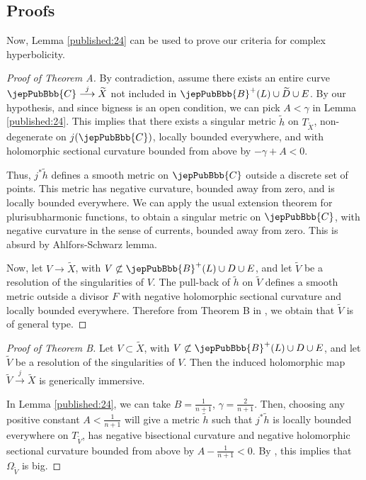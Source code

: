 \subsection{Proofs}

Now, Lemma \ref{published:24} can be used to prove our criteria for complex hyperbolicity.

\begin{proof}[Proof of Theorem A]

By contradiction, assume there exists an entire curve  $\jepPubBbb{C} \overset{j}{\longrightarrow} \widetilde{X}$ not included in $\jepPubBbb{B}^+(L) \cup \widetilde{D} \cup E$. By our hypothesis, and since bigness is an open condition, we can pick $A <  \gamma$ in Lemma \ref{published:24}. This implies that there exists a singular metric $\widetilde{h}$ on $T_{\widetilde{X}}$, non-degenerate on $j(\jepPubBbb{C})$, locally bounded everywhere, and with holomorphic sectional curvature bounded from above by $- \gamma + A < 0$. 

Thus, $j^\ast \widetilde{h}$ defines a smooth metric on $\jepPubBbb{C}$ outside a discrete set of points. This metric has negative curvature, bounded away from zero, and is locally bounded everywhere. We can apply the usual extension theorem for plurisubharmonic functions, to obtain 
a singular metric on $\jepPubBbb{C}$, with negative curvature in the sense of currents, bounded away from zero. This is absurd by Ahlfors-Schwarz lemma. 

Now, let $V \longrightarrow \widetilde{X}$, with $V \not\subset \jepPubBbb{B}^+(L) \cup D \cup E$, and let $\widetilde{V}$ be a resolution of the singularities of $V$. The pull-back of $\widetilde{h}$ on $\widetilde{V}$ defines a smooth metric outside a divisor $F$ with negative holomorphic sectional curvature and locally bounded everywhere. Therefore from Theorem B in \cite{pubref16}, we obtain that $\widetilde{V}$ is of general type.
\end{proof}

\begin{proof}[Proof of Theorem B] Let $V \subset \widetilde{X}$, with $V \not\subset \jepPubBbb{B}^+(L) \cup D \cup E$, and let $\widetilde{V}$ be a resolution of the singularities of $V$. Then the induced holomorphic map $\widetilde{V} \overset{j}{\longrightarrow} \widetilde{X}$ is generically immersive.

In Lemma \ref{published:24}, we can take $B = \frac{1}{n+1}$, $\gamma = \frac{2}{n+1}$. Then, choosing any positive constant $A < \frac{1}{n+1}$ will give a metric $\widetilde{h}$ such that $j^\ast \widetilde{h}$ is locally bounded everywhere on $T_{\widetilde{V}}$, has negative bisectional curvature and negative holomorphic sectional curvature bounded from above by $A - \frac{1}{n+1} < 0$. By \cite{pubref06}, this implies that $\Omega_{\widetilde{V}}$ is big.  
\end{proof}

